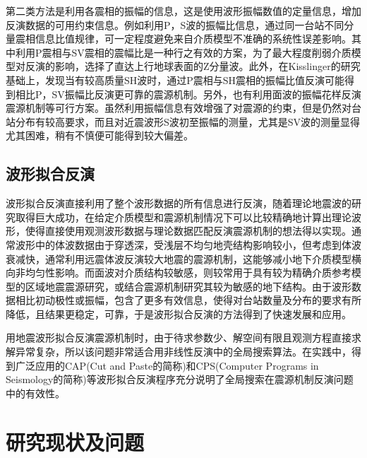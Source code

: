 第二类方法是利用各震相的振幅的信息，这是使用波形振幅数值的定量信息，增加反演数据的可用约束信息。例如利用P，S波的振幅比信息，通过同一台站不同分量震相信息比值规律，可一定程度避免来自介质模型不准确的系统性误差影响。其中利用P震相与SV震相的震幅比\citep{Kisslinger1982,Kisslinger1980}是一种行之有效的方案，为了最大程度削弱介质模型对反演的影响，选择了直达上行地球表面的Z分量波。此外，在Kisslinger的研究基础上，发现当有较高质量SH波时，通过P震相与SH震相的振幅比值反演可能得到相比P，SV振幅比反演更可靠的震源机制。另外，也有利用面波的振幅花样\citep{Stein2003}反演震源机制等可行方案。虽然利用振幅信息有效增强了对震源的约束，但是仍然对台站分布有较高要求，而且对近震波形S波初至振幅的测量，尤其是SV波的测量显得尤其困难，稍有不慎便可能得到较大偏差。

\subsection{波形拟合反演}

波形拟合反演直接利用了整个波形数据的所有信息进行反演，随着理论地震波的研究取得巨大成功\citep{Haskell1964,Herrmann1979,Wang1980}，在给定介质模型和震源机制情况下可以比较精确地计算出理论波形，使得直接使用观测波形数据与理论数据匹配反演震源机制的想法得以实现。通常波形中的体波数据由于穿透深，受浅层不均匀地壳结构影响较小，但考虑到体波衰减快，通常利用远震体波反演较大地震的震源机制，这能够减小地下介质模型横向非均匀性影响。而面波对介质结构较敏感，则较常用于具有较为精确介质参考模型的区域地震震源研究，或结合震源机制研究其较为敏感的地下结构\citep{Nolet1990}。由于波形数据相比初动极性或振幅，包含了更多有效信息，使得对台站数量及分布的要求有所降低，且结果更稳定，可靠，于是波形拟合反演的方法得到了快速发展和应用\citep{Walter1993,Ritsema1993,Zhao1994,Nabvelek1995}。

用地震波形拟合反演震源机制时，由于待求参数少、解空间有限且观测方程直接求解异常复杂，所以该问题非常适合用非线性反演中的全局搜索算法。在实践中，得到广泛应用的CAP(Cut and Paste的简称)\citep{Zhao1994,Zhu1996,Tan2006}和CPS(Computer Programs in Seismology的简称)\citep{Herrmann1989}等波形拟合反演程序充分说明了全局搜索在震源机制反演问题中的有效性。

\section{研究现状及问题}


